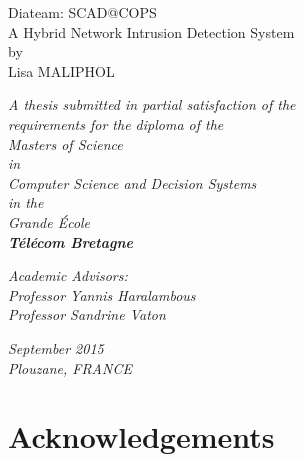 \documentclass[12pt,]{article}
\begin{document}
\begin{center}

\vspace{30mm}

{\Huge Diateam: SCAD@COPS}\\
\bigskip
{\Huge A Hybrid Network Intrusion Detection System}\\
\vspace{15mm}
{\Large by}\\

\vspace{18mm}
{\huge Lisa MALIPHOL}\\

\vspace{25mm}

\textit{A thesis submitted in partial satisfaction of the}\\
\medskip
\textit{requirements for the diploma of the}\\
\medskip
\textit{Masters of Science}\\
\medskip
\textit{in}\\
\medskip
\textit{Computer Science and Decision Systems}\\
\medskip
\textit{in the}\\
\medskip
\textit{Grande École}\\
\medskip
\textbf{\textit{\Large Télécom Bretagne}}\\

\vspace{10mm}

\textit{Academic Advisors:}\\
\medskip
\textit{Professor Yannis Haralambous}\\
\medskip
\textit{Professor Sandrine Vaton}\\

\vspace{15mm}

\textit{September 2015}\\
\medskip
\textit{Plouzane, FRANCE}\\

\end{center}

\thispagestyle{empty} \newpage
\mbox{} \thispagestyle{empty}

\newpage

\section*{Acknowledgements}\label{acknowledgements}
\end{document}
